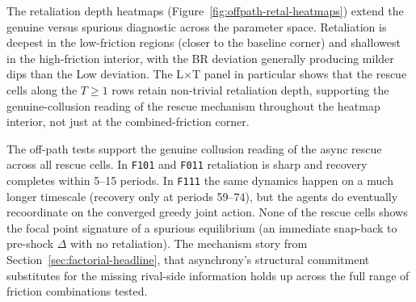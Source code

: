 The retaliation depth heatmaps (Figure~\ref{fig:offpath-retal-heatmaps}) extend the genuine versus spurious diagnostic across the parameter space. Retaliation is deepest in the low-friction regions (closer to the baseline corner) and shallowest in the high-friction interior, with the BR deviation generally producing milder dips than the Low deviation. The L$\times$T panel in particular shows that the rescue cells along the $T\geq 1$ rows retain non-trivial retaliation depth, supporting the genuine-collusion reading of the rescue mechanism throughout the heatmap interior, not just at the combined-friction corner.

The off-path tests support the genuine collusion reading of the async rescue across all rescue cells. In \texttt{F101} and \texttt{F011} retaliation is sharp and recovery completes within 5--15 periods. In \texttt{F111} the same dynamics happen on a much longer timescale (recovery only at periods 59--74), but the agents do eventually recoordinate on the converged greedy joint action. None of the rescue cells shows the focal point signature of a spurious equilibrium (an immediate snap-back to pre-shock $\Delta$ with no retaliation). The mechanism story from Section~\ref{sec:factorial-headline}, that asynchrony's structural commitment substitutes for the missing rival-side information holds up across the full range of friction combinations tested.

\clearpage
